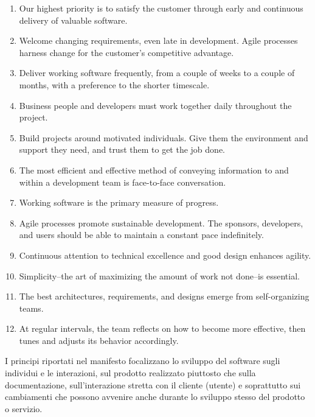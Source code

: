 \begin{enumerate}
    \item Our highest priority is to satisfy the customer
through early and continuous delivery
of valuable software.

\item Welcome changing requirements, even late in
development. Agile processes harness change for
the customer's competitive advantage.

\item Deliver working software frequently, from a
couple of weeks to a couple of months, with a
preference to the shorter timescale.

\item Business people and developers must work
together daily throughout the project.

\item Build projects around motivated individuals.
Give them the environment and support they need,
and trust them to get the job done.

\item The most efficient and effective method of
conveying information to and within a development
team is face-to-face conversation.

\item Working software is the primary measure of progress.

\item Agile processes promote sustainable development.
The sponsors, developers, and users should be able
to maintain a constant pace indefinitely.

\item Continuous attention to technical excellence
and good design enhances agility.

\item Simplicity--the art of maximizing the amount
of work not done--is essential.

\item The best architectures, requirements, and designs
emerge from self-organizing teams.

\item At regular intervals, the team reflects on how
to become more effective, then tunes and adjusts
its behavior accordingly.

\end{enumerate}


I principi riportati nel manifesto focalizzano lo sviluppo del software sugli individui e le interazioni, sul prodotto realizzato piuttosto che sulla documentazione, sull’interazione stretta con il cliente (utente) e soprattutto sui cambiamenti che possono avvenire anche durante lo sviluppo stesso del prodotto o servizio.

